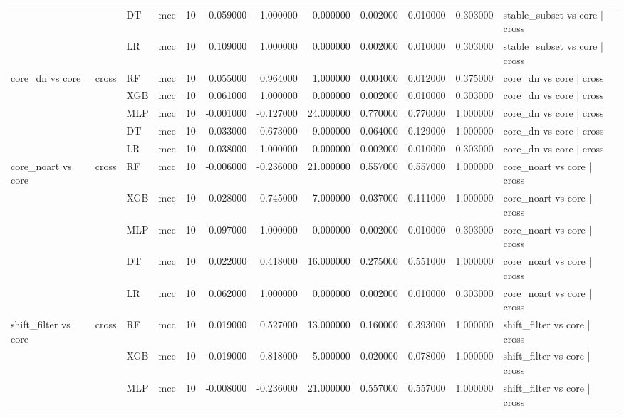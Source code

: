 \begin{tabular}{llllrrrrrrrl}
 &  & DT & mcc & 10 & -0.059000 & -1.000000 & 0.000000 & 0.002000 & 0.010000 & 0.303000 & stable_subset vs core | cross \\
 &  & LR & mcc & 10 & 0.109000 & 1.000000 & 0.000000 & 0.002000 & 0.010000 & 0.303000 & stable_subset vs core | cross \\
\cline{1-12} \cline{2-12}
\multirow[t]{5}{*}{core_dn vs core} & \multirow[t]{5}{*}{cross} & RF & mcc & 10 & 0.055000 & 0.964000 & 1.000000 & 0.004000 & 0.012000 & 0.375000 & core_dn vs core | cross \\
 &  & XGB & mcc & 10 & 0.061000 & 1.000000 & 0.000000 & 0.002000 & 0.010000 & 0.303000 & core_dn vs core | cross \\
 &  & MLP & mcc & 10 & -0.001000 & -0.127000 & 24.000000 & 0.770000 & 0.770000 & 1.000000 & core_dn vs core | cross \\
 &  & DT & mcc & 10 & 0.033000 & 0.673000 & 9.000000 & 0.064000 & 0.129000 & 1.000000 & core_dn vs core | cross \\
 &  & LR & mcc & 10 & 0.038000 & 1.000000 & 0.000000 & 0.002000 & 0.010000 & 0.303000 & core_dn vs core | cross \\
\cline{1-12} \cline{2-12}
\multirow[t]{5}{*}{core_noart vs core} & \multirow[t]{5}{*}{cross} & RF & mcc & 10 & -0.006000 & -0.236000 & 21.000000 & 0.557000 & 0.557000 & 1.000000 & core_noart vs core | cross \\
 &  & XGB & mcc & 10 & 0.028000 & 0.745000 & 7.000000 & 0.037000 & 0.111000 & 1.000000 & core_noart vs core | cross \\
 &  & MLP & mcc & 10 & 0.097000 & 1.000000 & 0.000000 & 0.002000 & 0.010000 & 0.303000 & core_noart vs core | cross \\
 &  & DT & mcc & 10 & 0.022000 & 0.418000 & 16.000000 & 0.275000 & 0.551000 & 1.000000 & core_noart vs core | cross \\
 &  & LR & mcc & 10 & 0.062000 & 1.000000 & 0.000000 & 0.002000 & 0.010000 & 0.303000 & core_noart vs core | cross \\
\cline{1-12} \cline{2-12}
\multirow[t]{5}{*}{shift_filter vs core} & \multirow[t]{5}{*}{cross} & RF & mcc & 10 & 0.019000 & 0.527000 & 13.000000 & 0.160000 & 0.393000 & 1.000000 & shift_filter vs core | cross \\
 &  & XGB & mcc & 10 & -0.019000 & -0.818000 & 5.000000 & 0.020000 & 0.078000 & 1.000000 & shift_filter vs core | cross \\
 &  & MLP & mcc & 10 & -0.008000 & -0.236000 & 21.000000 & 0.557000 & 0.557000 & 1.000000 & shift_filter vs core | cross \\

\end{tabular}
